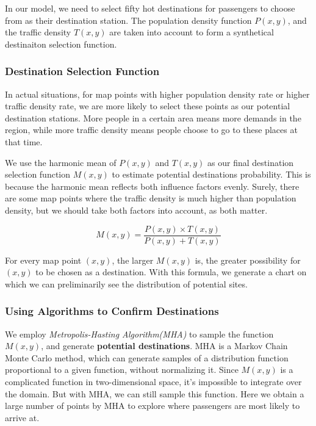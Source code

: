 \documentclass{mcmthesis}
\begin{document}
In our model, we need to select fifty hot destinations for passengers to choose from as their destination station. The population density function $P(x,y)$, and the traffic density $T(x,y)$ are taken into account to form a synthetical destinaiton selection function.

\subsubsection{Destination Selection Function}
In actual situations, for map points with higher population density rate or higher traffic density rate, we are more likely to select these points as our potential destination stations. More people in a certain area means more demands in the region, while more traffic density means people choose to go to these places at that time. 

We use the harmonic mean of $P(x,y)$ and $T(x,y)$ as our final destination selection function $M(x,y)$ to estimate potential destinations probability. This is because the harmonic mean reflects both influence factors evenly. Surely, there are some map points where the traffic density is much higher than population density, but we should take both factors into account, as both matter.

\begin{equation}\label{eq_product&sum}
    M(x,y) = \frac{P(x,y) \times T(x,y)}{P(x,y) + T(x,y)}
\end{equation}

For every map point $(x,y)$, the larger $M(x,y)$ is, the greater possibility for $(x,y)$ to be chosen as a destination. With this formula, we generate a chart on which we can preliminarily see the distribution of potential sites.

\subsubsection{Using Algorithms to Confirm Destinations}
We employ \emph{Metropolis-Hasting Algorithm(MHA)} to sample the function $M(x,y)$, and generate \textbf{potential destinations}. MHA is a Markov Chain Monte Carlo method, which can generate samples of a distribution function proportional to a given function, without normalizing it. Since $M(x,y)$ is a complicated function in two-dimensional space, it's impossible to integrate over the domain. But with MHA, we can still sample this function. Here we obtain a large number of points by MHA to explore where passengers are most likely to arrive at.
\end{document}
